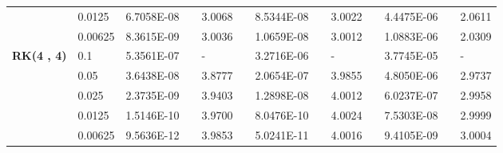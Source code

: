 \begin{table}[H]
\begin{tabular}{lllllrlrlrlrlrl}
	\multicolumn{2}{l}{} & \multicolumn{2}{l}{0.0125} & 6.7058E-08 &       & 3.0068  &       & 8.5344E-08 &       & 3.0022  &       & 4.4475E-06 &       & 2.0611  \\
	\multicolumn{2}{l}{} & \multicolumn{2}{l}{0.00625} & 8.3615E-09 &       & 3.0036  &       & 1.0659E-08 &       & 3.0012  &       & 1.0883E-06 &       & 2.0309  \\
	\multicolumn{2}{l}{\multirow{5}[1]{*}{\textbf{RK(4 , 4)}}} & \multicolumn{2}{l}{0.1} & 5.3561E-07 &       & -     &       & 3.2716E-06 &       & -     &       & 3.7745E-05 &       & - \\
	\multicolumn{2}{l}{} & \multicolumn{2}{l}{0.05} & 3.6438E-08 &       & 3.8777  &       & 2.0654E-07 &       & 3.9855  &       & 4.8050E-06 &       & 2.9737  \\
	\multicolumn{2}{l}{} & \multicolumn{2}{l}{0.025} & 2.3735E-09 &       & 3.9403  &       & 1.2898E-08 &       & 4.0012  &       & 6.0237E-07 &       & 2.9958  \\
	\multicolumn{2}{l}{} & \multicolumn{2}{l}{0.0125} & 1.5146E-10 &       & 3.9700  &       & 8.0476E-10 &       & 4.0024  &       & 7.5303E-08 &       & 2.9999  \\
	\multicolumn{2}{l}{} & \multicolumn{2}{l}{0.00625} & 9.5636E-12 &       & 3.9853  &       & 5.0241E-11 &       & 4.0016  &       & 9.4105E-09 &       & 3.0004  \\
	\bottomrule
	\end{tabular}%
	\label{tab_SAVRRK:6-3}%
	\end{table}%
	
